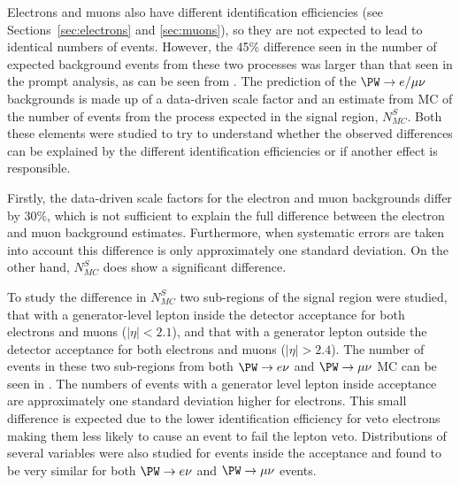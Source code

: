 Electrons and muons also have different identification efficiencies (see Sections~\ref{sec:electrons} and \ref{sec:muons}), so they are not expected to lead to identical numbers of events. However, the 45\% difference seen in the number of expected background events from these two processes  was larger than that seen in the prompt analysis, as can be seen from . The prediction of the $\PW\rightarrow e/\mu\nu$ backgrounds is made up of a data-driven scale factor and an estimate from \ac{MC} of the number of events from the process expected in the signal region, $N_{MC}^{S}$. Both these elements were studied to try to understand whether the observed differences can be explained by the different identification efficiencies or if another effect is responsible.

Firstly, the data-driven scale factors for the electron and muon backgrounds differ by 30\%, which is not sufficient to explain the full difference between the electron and muon background estimates. Furthermore, when systematic errors are taken into account this difference is only approximately one standard deviation. On the other hand, $N_{MC}^{S}$ does show a significant difference.

To study the difference in $N_{MC}^{S}$ two sub-regions of the signal region were studied, that with a generator-level lepton inside the detector acceptance for both electrons and muons ($|\eta|<2.1$), and that with a generator lepton outside the detector acceptance for both electrons and muons ($|\eta|>2.4$). The number of events in these two sub-regions from both $\PW\rightarrow e\nu$ and $\PW\rightarrow\mu\nu$ \ac{MC} can be seen in . The numbers of events with a generator level lepton inside acceptance are approximately one standard deviation higher for electrons. This small difference is expected due to the lower identification efficiency for veto electrons making them less likely to cause an event to fail the lepton veto. Distributions of several variables were also studied for events inside the acceptance and found to be very similar for both $\PW\rightarrow e\nu$ and $\PW\rightarrow\mu\nu$ events.

